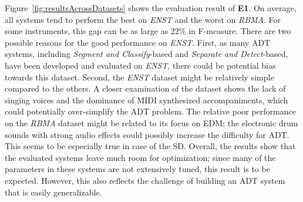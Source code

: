 \documentclass{article}
\newcommand{\comment}[1]{{\textcolor{blue}{#1}}}
\begin{document}
Figure~\ref{fig:resultsAcrossDatasets} shows the evaluation result of \textbf{E1}. On average, all systems tend to perform the best on \textit{ENST} and the worst on \textit{RBMA}. For some instruments, this gap can be as large as 22\% in F-measure. 
There are two possible reasons for the good performance on \textit{ENST}. %
First, as many ADT systems, including \textit{Segment and Classify}-based and \textit{Separate and Detect}-based, have been developed and evaluated on \textit{ENST}, there could be potential bias towards this dataset.
Second, the \textit{ENST} dataset might be relatively simple compared to the others. A closer examination of the dataset shows the lack of singing voices and the dominance of MIDI synthesized accompaniments, which could potentially over-simplify the ADT problem. 
The relative poor performance on the \textit{RBMA} dataset might be related to its focus on EDM; the electronic drum sounds with strong audio effects could possibly increase the difficulty for ADT. This seems to be especially true in case of the SD.
Overall, the results show that the evaluated systems leave much room for optimization; since many of the parameters in these systems are not extensively tuned, this result is to be expected. However, this also reflects the challenge of building an ADT system that is easily generalizable. 

\begin{table}[]
\centering
{}
\caption{Evaluation results of the feature-learning-paradigm-based systems.}%
\label{tab:e2result}
\end{table}
\end{document}
